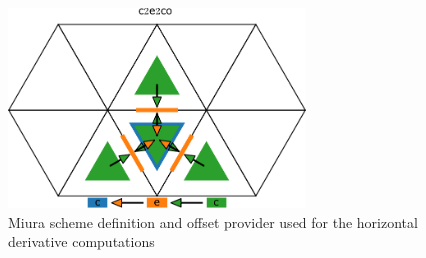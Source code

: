 \begin{figure}[h!]
  \begin{center}
     \hspace{10pt}
    \includegraphics[height=150pt]{imgs/offsetProvider_c2e2co} \hspace{10pt}
    
  \end{center}
  \caption{Miura scheme definition and offset provider used for the horizontal derivative computations}
  \label{fig:miura}
\end{figure}

